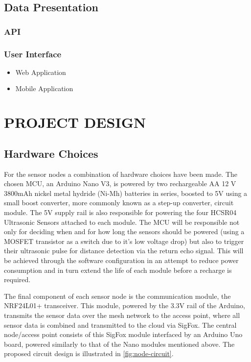 \documentclass[10pt,twocolumn]{witseiepaper}
\begin{document}
	\subsection{Data Presentation}
		\subsubsection{API}
		\subsubsection{User Interface}
			\begin{itemize}
				\item Web Application
				\item Mobile Application
			\end{itemize}

\section{PROJECT DESIGN}
	\subsection{Hardware Choices}
	
		For the sensor nodes a combination of hardware choices have been made. The chosen MCU, an Arduino Nano V3, is powered by two rechargeable AA 12 V 3800mAh nickel metal hydride (Ni-Mh) batteries in series, boosted to 5V using a small boost converter, more commonly known as a step-up converter, circuit module. The 5V supply rail is also responsible for powering the four HCSR04 Ultrasonic Sensors attached to each module. The MCU will be responsible not only for deciding when and for how long the sensors should be powered (using a MOSFET transistor as a switch due to it's low voltage drop) but also to trigger their ultrasonic pulse for distance detection via the return echo signal. This will be achieved through the software configuration in an attempt to reduce power consumption and in turn extend the life of each module before a recharge is required. 
		
		The final component of each sensor node is the communication module, the NRF24L01+ transceiver. This module, powered by the 3.3V rail of the Arduino, transmits the sensor data over the mesh network to the access point, where all sensor data is combined and transmitted to the cloud via SigFox. The central node/access point consists of this SigFox module interfaced by an Arduino Uno board, powered similarly to that of the Nano modules mentioned above. The proposed circuit design is illustrated in \cref{fig:node-circuit}.
\end{document}
